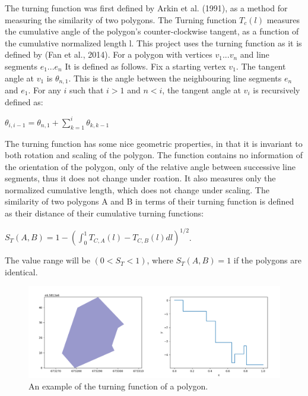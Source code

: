 \documentclass[a4paper]{article}
\begin{document}
The turning function was first defined by Arkin et al. (1991), as a method for measuring the similarity of two polygons. The Turning function $T_c(l)$ measures the cumulative angle of the polygon's counter-clockwise tangent, as a function of the cumulative normalized length l. This project uses the turning function as it is defined by (Fan et al., 2014). For a polygon with vertices ${v_1 ... v_n}$ and line segments ${e_1 ... e_n}$ It is defined as follows.
Fix a starting vertex $v_1$.
The tangent angle at $v_1$ is $\theta_{n,1}$. This is the angle between the neighbouring line segments $e_n$ and $e_1$.
For any $i$ such that $i>1$ and $n<i$, the tangent angle at $v_i$ is recursively defined as:
\begin{center}
    $\theta_{i, i-1} = \theta_{n,1} + \sum^{i}_{k=1} \theta_{k, k-1}$
\end{center}
The turning function has some nice geometric properties, in that it is invariant to both rotation and scaling of the polygon. The function contains no information of the orientation of the polygon, only of the relative angle between successive line segments, thus it does not change under roation. It also measures only the normalized cumulative length, which does not change under scaling.
The similarity of two polygons A and B in terms of their turning function is defined as their distance of their cumulative turning functions:
\begin{center}
    $S_{T}(A, B) = 1 - (\int^{1}_{0} T_{C,A}(l) - T_{C,B}(l) dl)^{1/2}$.
\end{center}
The value range will be $(0 < S_{T} < 1)$, where $S_{T}(A,B) = 1$ if the polygons are identical. 

\begin{figure}[H]
    \centering
    \includegraphics[width=\textwidth,height=0.5\textheight,keepaspectratio]{img_turn_function}
    \caption{An example of the turning function of a polygon.}
    \label{fig:space}
\end{figure}
\end{document}
